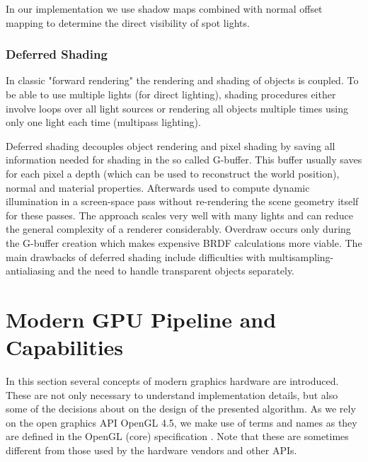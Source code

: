 \documentclass[thesis.tex]{subfiles}
\begin{document}
In our implementation we use shadow maps combined with normal offset mapping to determine the direct visibility of spot lights. 

\subsubsection{Deferred Shading}
In classic "forward rendering" the rendering and shading of objects is coupled.
To be able to use multiple lights (for direct lighting), shading procedures either involve loops over all light sources or rendering all objects multiple times using only one light each time (multipass lighting).

Deferred shading decouples object rendering and pixel shading by saving all information needed for shading in the so called G-buffer. 
This buffer usually saves for each pixel a depth (which can be used to reconstruct the world position), normal and material properties.
Afterwards used to compute dynamic illumination in a screen-space pass without re-rendering the scene geometry itself for these passes.
The approach scales very well with many lights and can reduce the general complexity of a renderer considerably.
Overdraw occurs only during the G-buffer creation which makes expensive BRDF calculations more viable.
The main drawbacks of deferred shading include difficulties with multisampling-antialiasing and the need to handle transparent objects separately.

\section{Modern GPU Pipeline and Capabilities}
In this section several concepts of modern graphics hardware are introduced.
These are not only necessary to understand implementation details, but also some of the decisions about on the design of the presented algorithm.
As we rely on the open graphics API OpenGL 4.5, we make use of terms and names as they are defined in the OpenGL (core) specification \cite{bib:openglspec}.
Note that these are sometimes different from those used by the hardware vendors and other APIs.

\end{document}
